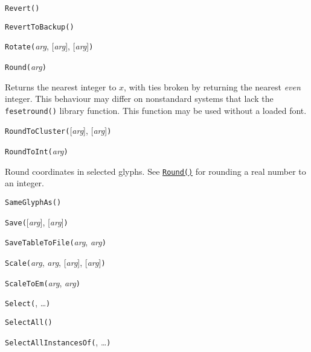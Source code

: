 \noindent\texttt{Revert(}\texttt{)}


\noindent\texttt{RevertToBackup(}\texttt{)}


\noindent\texttt{Rotate(}\textit{arg}, [\textit{arg}], [\textit{arg}]\texttt{)}


\noindent\texttt{Round(}\textit{arg}\texttt{)}

Returns the nearest integer to $x$, with ties broken by returning the
nearest \emph{even} integer.  This behaviour may differ on nonstandard
systems that lack the \texttt{fesetround()} library function.
This function may be used without a loaded font.


\noindent\texttt{RoundToCluster(}[\textit{arg}], [\textit{arg}]\texttt{)}


\noindent\texttt{RoundToInt(}\textit{arg}\texttt{)}

Round coordinates in selected glyphs.  See
\hyperref[func:Round]{\texttt{Round()}} for rounding a
real number to an integer.


\noindent\texttt{SameGlyphAs(}\texttt{)}


\noindent\texttt{Save(}[\textit{arg}], [\textit{arg}]\texttt{)}


\noindent\texttt{SaveTableToFile(}\textit{arg}, \textit{arg}\texttt{)}


\noindent\texttt{Scale(}\textit{arg}, \textit{arg}, [\textit{arg}], [\textit{arg}]\texttt{)}


\noindent\texttt{ScaleToEm(}\textit{arg}, \textit{arg}\texttt{)}


\noindent\texttt{Select(}, \ldots\texttt{)}


\noindent\texttt{SelectAll(}\texttt{)}


\noindent\texttt{SelectAllInstancesOf(}, \ldots\texttt{)}

